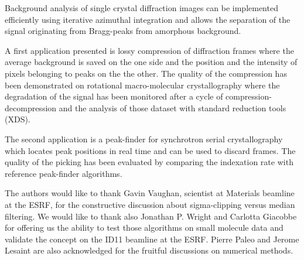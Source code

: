 \documentclass[preprint]{iucr}              %
\begin{document}
Background analysis of single crystal diffraction images can be implemented efficiently using iterative azimuthal integration and allows the separation of the signal originating from Bragg-peaks from amorphous background.

A first application presented is lossy compression of diffraction frames where the average background is saved on the one side and the position and the intensity of pixels belonging to peaks on the the other.
The quality of the compression has been demonstrated on rotational macro-molecular crystallography where the degradation of the signal has been monitored after a cycle of compression-decompression and the analysis of those dataset with standard reduction tools (XDS).

The second application is a peak-finder for synchrotron serial crystallography which locates peak positions in real time and can be used to discard frames. 
The quality of the picking has been evaluated by comparing the indexation rate with reference peak-finder algorithms.



The authors would like to thank Gavin Vaughan, scientist at Materials beamline at the ESRF,  for the constructive discussion about sigma-clipping versus median filtering. 
We would like to thank also Jonathan P. Wright and Carlotta Giacobbe for offering us the ability to test those algorithms on small molecule data and validate the concept on the ID11 beamline at the ESRF.
Pierre Paleo and Jerome Lesaint are also acknowledged for the fruitful discussions on numerical methods.



\end{document}
